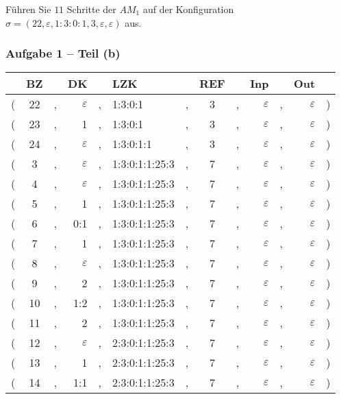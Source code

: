 \documentclass[aspectratio=1610,onlymath, ngerman]{beamer}
\renewcommand{\epsilon}{\varepsilon}
\newcommand*\head{\rowfont{\bfseries}}
\begin{document}
\begin{frame}
\begin{minipage}{\dimexpr0.33\linewidth-\fboxrule-\fboxsep}
\begin{ttfamily}
\begin{enumerate}[label=\arabic*:, nolistsep]
				\end{enumerate}
			\end{ttfamily}
		\end{minipage}
	
		\bigskip
		
		Führen Sie $11$ Schritte der $AM_1$ auf der Konfiguration $\sigma = (22, \epsilon, 1:3:0:1, 3, \epsilon, \epsilon)$ aus.
	\end{frame}
    
    \begin{frame} \frametitle{Aufgabe 1 -- Teil (b)}
    \footnotesize
    	
    	\begin{center}
    		\begin{tabu}{rccrclcccrcrl}
    			\head & BZ && DK && LZK && REF && Inp && Out & \\ \hline 
    			( & 22 &,& $\epsilon$ &,& 1:3:0:1 &,& 3 &,& $\epsilon$ &,& $\epsilon$ & ) \\
    			( & 23 &,& 1 &,& 1:3:0:1 &,& 3 &,& $\epsilon$ &,& $\epsilon$ & ) \\
    			( & 24 &,& $\epsilon$ &,& 1:3:0:1:1 &,& 3 &,& $\epsilon$ &,& $\epsilon$ & ) \\
    			( & 3 &,& $\epsilon$ &,& 1:3:0:1:1:25:3 &,& 7 &,& $\epsilon$ &,& $\epsilon$ & ) \\
    			( & 4 &,& $\epsilon$ &,& 1:3:0:1:1:25:3 &,& 7 &,& $\epsilon$ &,& $\epsilon$ & ) \\
    			( & 5 &,& 1 &,& 1:3:0:1:1:25:3 &,& 7 &,& $\epsilon$ &,& $\epsilon$ & ) \\
    			( & 6 &,& 0:1 &,& 1:3:0:1:1:25:3 &,& 7 &,& $\epsilon$ &,& $\epsilon$ & ) \\
    			( & 7 &,& 1 &,& 1:3:0:1:1:25:3 &,& 7 &,& $\epsilon$ &,& $\epsilon$ & ) \\
    			( & 8 &,& $\epsilon$ &,& 1:3:0:1:1:25:3 &,& 7 &,& $\epsilon$ &,& $\epsilon$ & ) \\
    			( & 9 &,& 2 &,& 1:3:0:1:1:25:3 &,& 7 &,& $\epsilon$ &,& $\epsilon$ & ) \\
    			( & 10 &,& 1:2 &,& 1:3:0:1:1:25:3 &,& 7 &,& $\epsilon$ &,& $\epsilon$ & ) \\
    			( & 11 &,& 2 &,& 1:3:0:1:1:25:3 &,& 7 &,& $\epsilon$ &,& $\epsilon$ & ) \\
    			( & 12 &,& $\epsilon$ &,& 2:3:0:1:1:25:3 &,& 7 &,& $\epsilon$ &,& $\epsilon$ & ) \\
    			( & 13 &,& 1 &,& 2:3:0:1:1:25:3 &,& 7 &,& $\epsilon$ &,& $\epsilon$ & ) \\
    			( & 14 &,& 1:1 &,& 2:3:0:1:1:25:3 &,& 7 &,& $\epsilon$ &,& $\epsilon$ & ) \\
    		\end{tabu}
    	\end{center}
    \end{frame}
\end{document}
